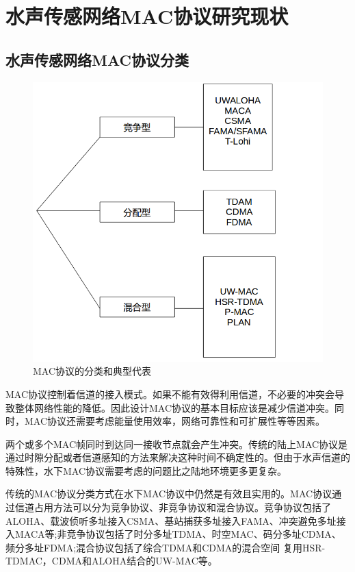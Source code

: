 \chapter{水声传感网络MAC协议研究现状 }
\section{水声传感网络MAC协议分类}
\begin{figure}[ht]
	\centering
	\includegraphics[scale=0.4]{figures/fenlei.png}
	\caption{
		MAC协议的分类和典型代表
	}
	\label{fig:example}
\end{figure}
MAC协议控制着信道的接入模式。如果不能有效得利用信道，不必要的冲突会导致整体网络性能的降低。因此设计MAC协议的基本目标应该是减少信道冲突。同时，MAC协议还需要考虑能量使用效率，网络可靠性和可扩展性等等因素。

两个或多个MAC帧同时到达同一接收节点就会产生冲突。传统的陆上MAC协议是通过时隙分配或者信道感知的方法来解决这种时间不确定性的。但由于水声信道的特殊性，水下MAC协议需要考虑的问题比之陆地环境更多更复杂。

传统的MAC协议分类方式在水下MAC协议中仍然是有效且实用的。MAC协议通过信道占用方法可以分为竞争协议、非竞争协议和混合协议。竞争协议包括了ALOHA、载波侦听多址接入CSMA、基站捕获多址接入FAMA、冲突避免多址接入MACA等;非竞争协议包括了时分多址TDMA、时空MAC、码分多址CDMA、频分多址FDMA;混合协议包括了综合TDMA和CDMA的混合空间
复用HSR-TDMAC，CDMA和ALOHA结合的UW-MAC等。
